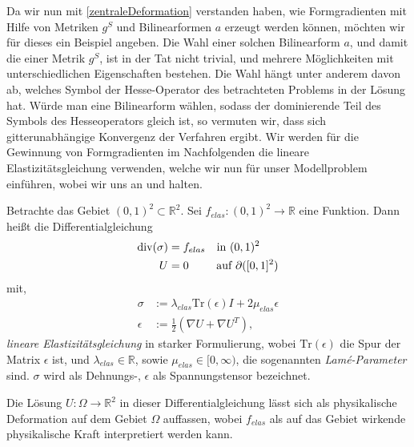 Da wir nun mit \ref{zentraleDeformation} verstanden haben, wie Formgradienten mit Hilfe von Metriken $g^S$ und Bilinearformen $a$ erzeugt werden können, möchten wir für dieses ein Beispiel angeben. Die Wahl einer solchen Bilinearform $a$, und damit die einer Metrik $g^S$, ist in der Tat nicht trivial, und mehrere Möglichkeiten mit unterschiedlichen Eigenschaften bestehen. Die Wahl hängt unter anderem davon ab,
welches Symbol der Hesse-Operator des betrachteten Problems in der Lösung hat. Würde man eine Bilinearform wählen, sodass der dominierende Teil des Symbols des Hesseoperators gleich ist, so vermuten wir, dass sich gitterunabhängige Konvergenz der Verfahren ergibt. Wir werden für die Gewinnung von Formgradienten im Nachfolgenden die lineare Elastizitätsgleichung verwenden, welche wir nun für unser Modellproblem einführen, wobei wir uns an \cite{bfgs1} und \cite{bfgs2} halten. 

\begin{defi}
	Betrachte das Gebiet $(0,1)^2 \subset \mathbb{R}^2$. Sei $f_{elas}: (0,1)^2 \rightarrow \mathbb{R}$ eine Funktion. Dann heißt die Differentialgleichung
	\begin{equation}\label{linelas}
		\begin{aligned}
		\text{div}(\sigma) &= f_{elas} \quad \text{in } (0,1)^2 \\
		U &= 0 \quad \hspace{0.2cm} \;\;\text{ auf } \partial([0,1]^2)
		\end{aligned}
	\end{equation}	 
	mit,
	\begin{align*}
		\sigma &:= \lambda_{elas} \text{Tr}(\epsilon)I + 2\mu_{elas}\epsilon \\
		\epsilon &:= \frac{1}{2}(\nabla U + \nabla U^T),
	\end{align*}
	\textit{lineare Elastizitätsgleichung} in starker Formulierung, wobei $\text{Tr}(\epsilon)$ die Spur der Matrix $\epsilon$ ist, und $\lambda_{elas} \in \mathbb{R}$, sowie $\mu_{elas} \in [0,\infty)$, die sogenannten \textit{Lamé-Parameter} sind. $\sigma$ wird als Dehnungs-, $\epsilon$ als Spannungstensor bezeichnet. 
\end{defi}

Die Lösung $U: \Omega \rightarrow \mathbb{R}^2$ in dieser Differentialgleichung lässt sich als physikalische Deformation auf dem Gebiet $\Omega$ auffassen, wobei $f_{elas}$ als auf das Gebiet wirkende physikalische Kraft interpretiert werden kann. 

